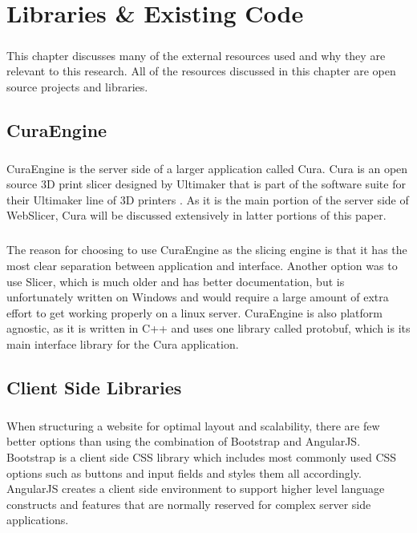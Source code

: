 \chapter{Libraries \& Existing Code}
\paragraph{}
This chapter discusses many of the external resources used and why they are relevant to this research. All of the resources discussed in this chapter are open source projects and libraries.

\section{CuraEngine}
\paragraph{}
CuraEngine is the server side of a larger application called Cura.
Cura is an open source 3D print slicer designed by Ultimaker that is part of the software suite for their Ultimaker line of 3D printers \citep{curaengine-2016}.
As it is the main portion of the server side of WebSlicer, Cura will be discussed extensively in latter portions of this paper.

\paragraph{}
The reason for choosing to use CuraEngine as the slicing engine is that it has the most clear separation between application and interface.
Another option was to use Slicer, which is much older and has better documentation, but is unfortunately written on Windows and would require a large amount of extra effort to get working properly on a linux server.
CuraEngine is also platform agnostic, as it is written in C++ and uses one library called protobuf, which is its main interface library for the Cura application.

\section{Client Side Libraries}
\paragraph{}
When structuring a website for optimal layout and scalability, there are few better options than using the combination of Bootstrap and AngularJS.
Bootstrap is a client side CSS library which includes most commonly used CSS options such as buttons and input fields and styles them all accordingly.
AngularJS creates a client side environment to support higher level language constructs and features that are normally reserved for complex server side applications.

